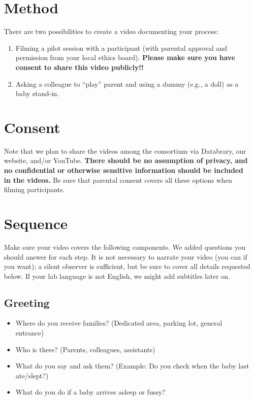\documentclass[
  letterpaper,
  DIV=11,
  numbers=noendperiod,
  oneside]{scrreprt}
\providecommand{\tightlist}{%
  \setlength{\itemsep}{0pt}\setlength{\parskip}{0pt}}
\begin{document}
\section{Method}\label{method}

There are two possibilities to create a video documenting your process:

\begin{enumerate}
\def\labelenumi{\arabic{enumi}.}
\tightlist
\item
  Filming a pilot session with a participant (with parental approval and
  permission from your local ethics board). \textbf{Please make sure you
  have consent to share this video publicly!!}
\item
  Asking a colleague to ``play'' parent and using a dummy (e.g., a doll)
  as a baby stand-in.
\end{enumerate}

\section{Consent}\label{consent}

Note that we plan to share the videos among the consortium via
Databrary, our website, and/or YouTube. \textbf{There should be no
assumption of privacy, and no confidential or otherwise sensitive
information should be included in the videos.} Be sure that parental
consent covers all these options when filming participants.

\section{Sequence}\label{sequence}

Make sure your video covers the following components. We added questions
you should answer for each step. It is not necessary to narrate your
video (you can if you want); a silent observer is sufficient, but be
sure to cover all details requested below. If your lab language is not
English, we might add subtitles later on.

\subsection{Greeting}\label{greeting}

\begin{itemize}
\tightlist
\item
  Where do you receive families? (Dedicated area, parking lot, general
  entrance)
\item
  Who is there? (Parents, colleagues, assistants)
\item
  What do you say and ask them? (Example: Do you check when the baby
  last ate/slept?)
\item
  What do you do if a baby arrives asleep or fussy?
\end{itemize}
\end{document}
